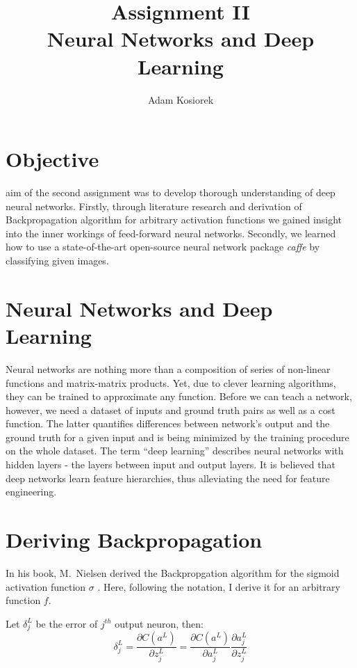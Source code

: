 \documentclass[journal, a4paper]{IEEEtran}
\begin{document}
	\title{Assignment II\\Neural Networks and Deep Learning}
	\author{Adam Kosiorek}	
	\maketitle
	
	
\section{Objective}
     aim of the second assignment was to develop thorough understanding of deep neural networks. Firstly, through literature research and derivation of Backpropagation algorithm for arbitrary activation functions we gained insight into the inner workings of feed-forward neural networks. Secondly, we learned how to use a state-of-the-art open-source neural network package \textit{caffe} \cite{caffe} by classifying given images.

\section{Neural Networks and Deep Learning}
    Neural networks are nothing more than a composition of series of non-linear functions and matrix-matrix products. Yet, due to clever learning algorithms, they can be trained to approximate any function. Before we can teach a network, however, we need a dataset of inputs and ground truth pairs as well as a cost function. The latter quantifies differences between network's output and the ground truth for a given input and is being minimized by the training procedure on the whole dataset. The term ``deep learning'' describes neural networks with hidden layers - the layers between input and output layers. It is believed that deep networks learn feature hierarchies, thus alleviating the need for feature engineering.

\section{Deriving Backpropagation}
    In his book, M.~Nielsen derived the Backpropgation algorithm for the sigmoid activation function $\sigma$ \cite{MLDL}. Here, following the notation, I derive it for an arbitrary function $f$.
    
    Let $\delta_j^L$ be the error of $j^{th}$ output neuron, then:
    \begin{equation}
      \delta_j^L = \frac{\partial C(a^L)}{\partial z_j^L} = \frac{\partial C(a^L)}{\partial a_j^L} \frac{\partial a_j^L}{\partial z_j^L}
    \end{equation}
    
\end{document}

